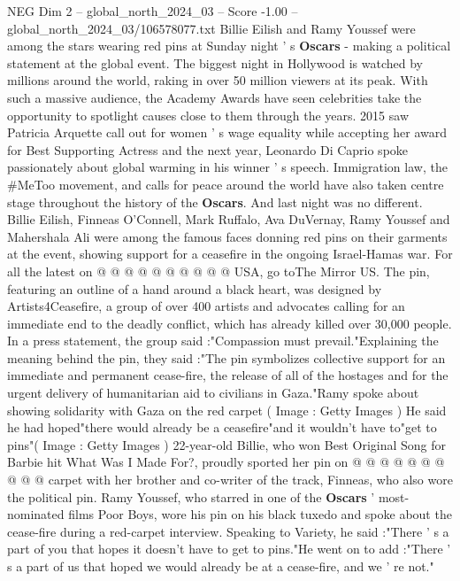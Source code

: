 \begin{textsample}{NEG Dim 2 – global\_north\_2024\_03 – Score -1.00 – global\_north\_2024\_03/106578077.txt}  \label{ex:f2_neg_077}
Billie Eilish and Ramy Youssef were among the stars wearing red pins at Sunday night ' s \textbf{Oscars} - making a political statement at the global event.
The biggest night in Hollywood is watched by millions around the world, raking in over 50 million viewers at its peak.
With such a massive audience, the Academy Awards have seen celebrities take the opportunity to spotlight causes close to them through the years. 2015 saw Patricia Arquette call out for women ' s wage equality while accepting her award for Best Supporting Actress and the next year, Leonardo Di Caprio spoke passionately about global warming in his winner ' s speech.
Immigration law, the \#MeToo movement, and calls for peace around the world have also taken centre stage throughout the history of the \textbf{Oscars}.
And last night was no different.
Billie Eilish, Finneas O'Connell, Mark Ruffalo, Ava DuVernay, Ramy Youssef and Mahershala Ali were among the famous faces donning red pins on their garments at the event, showing support for a ceasefire in the ongoing Israel-Hamas war.
For all the latest on @ @ @ @ @ @ @ @ @ @ USA, go toThe Mirror US.
The pin, featuring an outline of a hand around a black heart, was designed by Artists4Ceasefire, a group of over 400 artists and advocates calling for an immediate end to the deadly conflict, which has already killed over 30,000 people.
In a press statement, the group said :"Compassion must prevail."Explaining the meaning behind the pin, they said :"The pin symbolizes collective support for an immediate and permanent cease-fire, the release of all of the hostages and for the urgent delivery of humanitarian aid to civilians in Gaza."Ramy spoke about showing solidarity with Gaza on the red carpet ( Image : Getty Images ) He said he had hoped"there would already be a ceasefire"and it wouldn't have to"get to pins"( Image : Getty Images ) 22-year-old Billie, who won Best Original Song for Barbie hit What Was I Made For?, proudly sported her pin on @ @ @ @ @ @ @ @ @ @ carpet with her brother and co-writer of the track, Finneas, who also wore the political pin.
Ramy Youssef, who starred in one of the \textbf{Oscars} ' most-nominated films Poor Boys, wore his pin on his black tuxedo and spoke about the cease-fire during a red-carpet interview.
Speaking to Variety, he said :"There ' s a part of you that hopes it doesn't have to get to pins."He went on to add :"There ' s a part of us that hoped we would already be at a cease-fire, and we ' re not."

\end{textsample}
